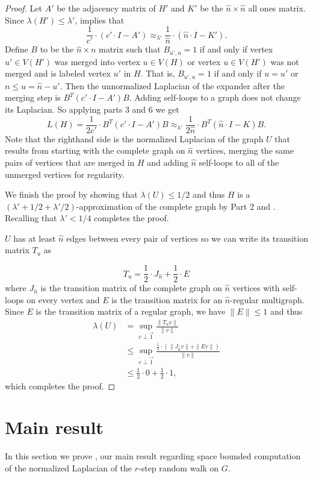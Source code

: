 \documentclass{toc}
\numberwithin{myalgctr}{section}
\theoremstyle{named}
\begin{document}
\begin{proof}
Let $A'$ be the adjacency matrix of $H'$ and $K'$ be the $\hat{n}\times \hat{n}$ all ones matrix. Since $\lambda(H')\leq\lambda'$,  implies that 
\[
\frac{1}{c'}\cdot (c'\cdot I- A')\approx_{\lambda'}\frac{1}{\hat{n}}\cdot(\hat{n}\cdot I-K').
\]
Define $B$ to be the $\hat{n}\times n$ matrix such that $B_{u',u}=1$ if and only if vertex $u'\in V(H')$ was merged into vertex $u\in V(H)$ or vertex $u\in V(H')$ was not merged and is labeled vertex $u'$ in $H$. That is, $B_{u',u}=1$ if and only if $u=u'$ or $n\leq u = \hat{n}-u'$. Then the unnormalized Laplacian of the expander after the merging step is $B^{T}(c'\cdot I-A')B$. Adding self-loops to a graph does not change its Laplacian. So applying  parts 3 and 6 we get
\[
L(H) = \frac{1}{2c'}\cdot B^{T}(c'\cdot I-A')B \approx_{\lambda'}\frac{1}{2\hat{n}}\cdot B^{T}(\hat{n}\cdot I-K)B.
\]
Note that the righthand side is the normalized Laplacian of the graph $U$ that results from starting with the complete graph on $\hat{n}$ vertices, merging the same pairs of vertices that are merged in $H$ and adding $\hat{n}$ self-loops to all of the unmerged vertices for regularity.

We finish the proof by showing that $\lambda(U)\leq 1/2$ and thus $H$ is a $(\lambda'+1/2+\lambda'/2)$-approximation of the complete graph by  Part 2 and . Recalling that $\lambda'<1/4$ completes the proof.

$U$ has at least $\hat{n}$ edges between every pair of vertices so we can write its transition matrix $T_u$ as 

\[
T_u = \frac{1}{2}\cdot J_{\hat{n}} + \frac{1}{2}\cdot E
\]
where $J_{\hat{n}}$ is the transition matrix of the complete graph on $\hat{n}$ vertices with self-loops on every vertex and $E$ is the transition matrix for an $\hat{n}$-regular multigraph. Since $E$ is the transition matrix of a regular graph, we have $\|E\|\leq 1$ and thus 
\begin{align*}
\lambda(U)&=\sup_{v\perp\vec{1}}\frac{\|T_uv\|}{\|v\|}\\
&\leq \sup_{v\perp\vec{1}}\frac{\frac{1}{2}\cdot(\|J_{\hat{n}}v\|+\|Ev\|)}{\|v\|}\\
&\leq \frac{1}{2}\cdot 0 + \frac{1}{2}\cdot 1,
\end{align*}
which completes the proof.
\end{proof}


%
\section{Main result}
\label{sect:mainresult}
In this section we prove , our main result regarding space bounded computation of the normalized Laplacian of the $r$-step random walk on $G$.
\end{document}
